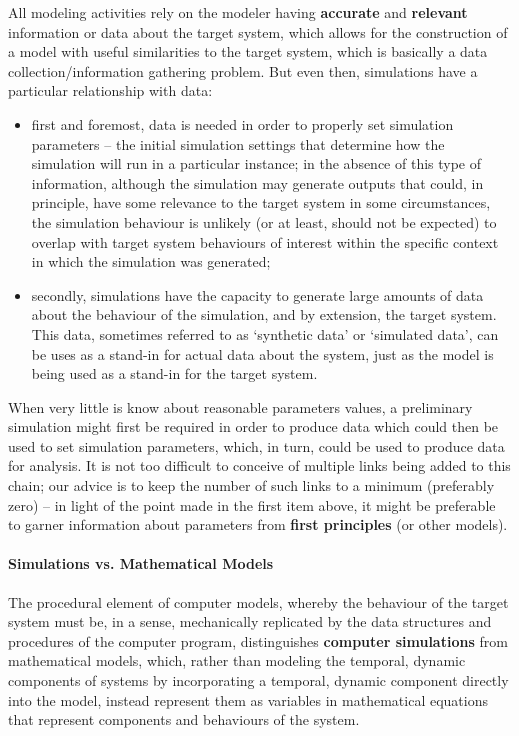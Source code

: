 All modeling activities rely on the modeler having \textbf{accurate} and \textbf{relevant} information or data about the target system, which allows for the construction of a model with useful similarities to the target system, which is basically a data collection/information gathering problem. But even then,  simulations have a particular relationship with data:
\begin{itemize}[noitemsep]
\item first and foremost, data is needed in order to properly set simulation parameters -- the initial simulation settings that determine how the simulation will run in a particular instance; in the absence of this type of information, although the simulation may generate outputs that could, in principle, have some relevance to the target system in some circumstances, the simulation behaviour is unlikely (or at least, should not be expected) to overlap with target system behaviours of interest within the specific context in which the simulation was generated;
\item secondly, simulations have the capacity to generate large amounts of data about the behaviour of the simulation, and by extension, the target system. This data, sometimes referred to as `synthetic data' or `simulated data', can be uses as a stand-in for actual data about the system, just as the model is being used as a stand-in for the target system.
\end{itemize}
When very little is know about reasonable parameters values, a preliminary simulation might first be required in order to produce data which could then be used to set simulation parameters, which, in turn, could be used to produce data for analysis. It is not too difficult to conceive of multiple links being added to this chain; our advice is to keep the number of such links to a minimum (preferably zero) -- in light of the point made in the first item above, it might be preferable to garner information about parameters from \textbf{first principles} (or other models).  
\paragraph{Simulations vs. Mathematical Models}
The procedural element of computer models, whereby the behaviour of the target system must be, in a sense, mechanically replicated by the data structures and procedures of the computer program, distinguishes \textbf{computer simulations} from mathematical models, which, rather than modeling the temporal, dynamic components of systems by incorporating a temporal, dynamic component directly into the model, instead represent them as variables in mathematical equations that represent components and behaviours of the system.

